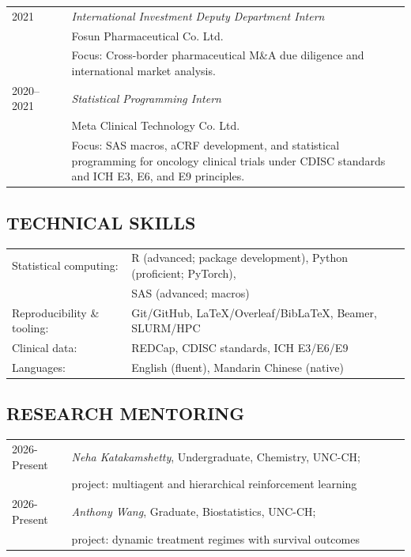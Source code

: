 \documentclass[11pt]{scrartcl}
\begin{document}
{{\begin{longtable}{p{0.15\linewidth}p{0.85\linewidth}}
    2021    & \textit{International Investment Deputy Department Intern}\\
    & Fosun Pharmaceutical Co. Ltd. \\
    & Focus: Cross-border pharmaceutical M\&A due diligence and international market analysis. \\

    2020--2021 & \textit{Statistical Programming Intern} \\
    & Meta Clinical Technology Co. Ltd. \\
    & Focus: SAS macros, aCRF development, and statistical programming for oncology clinical trials under CDISC standards and ICH E3, E6, and E9 principles. \\
\end{longtable}%
}

\subsection{\MakeUppercase{Technical Skills}}\label{technical-skills}
\noindent
{\def\arraystretch{1.2}\tabcolsep=0pt
\begin{longtable}{p{0.3\linewidth}p{0.7\linewidth}}
    {Statistical computing:} & R (advanced; package development), Python (proficient; PyTorch), \\ 
    & SAS (advanced; macros) \\
    
    {Reproducibility \& tooling:} & Git/GitHub, LaTeX/Overleaf/BibLaTeX, Beamer, SLURM/HPC \\
    
    {Clinical data:} & REDCap, CDISC standards, ICH E3/E6/E9 \\
    
    {Languages:} & English (fluent), Mandarin Chinese (native)
\end{longtable}%
}


\subsection{\MakeUppercase{Research Mentoring}}
\noindent
{\def\arraystretch{1.2}\tabcolsep=0pt
\begin{longtable}{p{0.15\linewidth}p{0.85\linewidth}}
    2026-Present & \textit{Neha Katakamshetty}, Undergraduate, Chemistry, UNC-CH; \\
    & project: multiagent and hierarchical reinforcement learning \\
    2026-Present & \textit{Anthony Wang}, 
    Graduate, Biostatistics, UNC-CH; \\
    & project: dynamic treatment regimes with survival outcomes \\
\end{longtable}%
}


}
\end{document}
